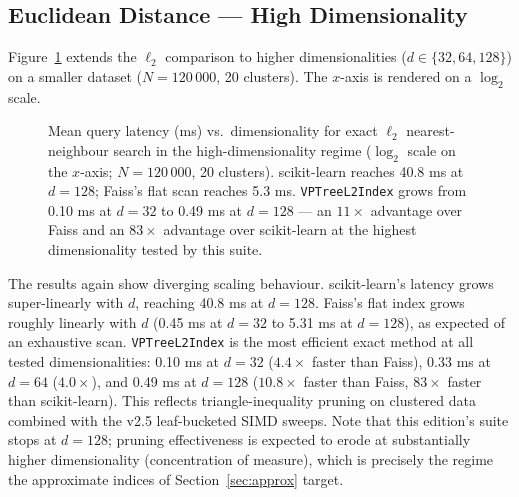 \documentclass[11pt,a4paper]{article}
\begin{document}
\subsection{Euclidean Distance — High Dimensionality}
\label{sec:l2-high}

Figure~\ref{fig:l2-high} extends the $\ell_2$ comparison to higher
dimensionalities ($d \in \{32, 64, 128\}$) on a smaller dataset
($N = 120\,000$, 20 clusters).  The $x$-axis is rendered on a $\log_2$
scale.

\begin{figure}[h]
\centering
{}
\caption{Mean query latency (ms) vs.\ dimensionality for exact $\ell_2$
  nearest-neighbour search in the high-dimensionality regime ($\log_2$ scale
  on the $x$-axis; $N=120\,000$, 20 clusters).  scikit-learn reaches
  40.8 ms at $d=128$; Faiss's flat scan reaches 5.3 ms.
  \texttt{VPTreeL2Index} grows from 0.10 ms at $d=32$ to 0.49 ms at
  $d=128$ — an $11\times$ advantage over Faiss and an $83\times$ advantage
  over scikit-learn at the highest dimensionality tested by this suite.}
\label{fig:l2-high}
\end{figure}

The results again show diverging scaling behaviour.  scikit-learn's latency
grows super-linearly with $d$, reaching 40.8 ms at $d=128$.  Faiss's flat
index grows roughly linearly with $d$ (0.45 ms at $d=32$ to 5.31 ms at
$d=128$), as expected of an exhaustive scan.  \texttt{VPTreeL2Index} is the
most efficient exact method at all tested dimensionalities: 0.10 ms at
$d=32$ ($4.4\times$ faster than Faiss), 0.33 ms at $d=64$ ($4.0\times$),
and 0.49 ms at $d=128$ ($10.8\times$ faster than Faiss, $83\times$ faster
than scikit-learn).  This reflects triangle-inequality pruning on clustered
data combined with the v2.5 leaf-bucketed SIMD sweeps.  Note that this
edition's suite stops at $d = 128$; pruning effectiveness is expected to
erode at substantially higher dimensionality (concentration of measure),
which is precisely the regime the approximate indices of
Section~\ref{sec:approx} target.
\end{document}
